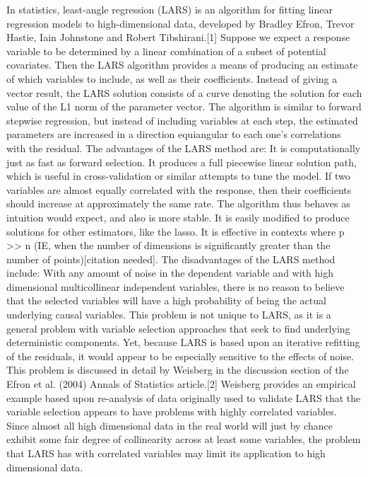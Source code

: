 In statistics, least-angle regression (LARS) is an algorithm for fitting linear regression models to high-dimensional data, developed by Bradley Efron, Trevor Hastie, Iain Johnstone and Robert Tibshirani.[1]
Suppose we expect a response variable to be determined by a linear combination of a subset of potential covariates. Then the LARS algorithm provides a means of producing an estimate of which variables to include, as well as their coefficients.
Instead of giving a vector result, the LARS solution consists of a curve denoting the solution for each value of the L1 norm of the parameter vector. The algorithm is similar to forward stepwise regression, but instead of including variables at each step, the estimated parameters are increased in a direction equiangular to each one's correlations with the residual.
The advantages of the LARS method are:
It is computationally just as fast as forward selection.
It produces a full piecewise linear solution path, which is useful in cross-validation or similar attempts to tune the model.
If two variables are almost equally correlated with the response, then their coefficients should increase at approximately the same rate. The algorithm thus behaves as intuition would expect, and also is more stable.
It is easily modified to produce solutions for other estimators, like the lasso.
It is effective in contexts where p >> n (IE, when the number of dimensions is significantly greater than the number of points)[citation needed].
The disadvantages of the LARS method include:
With any amount of noise in the dependent variable and with high dimensional multicollinear independent variables, there is no reason to believe that the selected variables will have a high probability of being the actual underlying causal variables. This problem is not unique to LARS, as it is a general problem with variable selection approaches that seek to find underlying deterministic components. Yet, because LARS is based upon an iterative refitting of the residuals, it would appear to be especially sensitive to the effects of noise. This problem is discussed in detail by Weisberg in the discussion section of the Efron et al. (2004) Annals of Statistics article.[2] Weisberg provides an empirical example based upon re-analysis of data originally used to validate LARS that the variable selection appears to have problems with highly correlated variables.
Since almost all high dimensional data in the real world will just by chance exhibit some fair degree of collinearity across at least some variables, the problem that LARS has with correlated variables may limit its application to high dimensional data.
